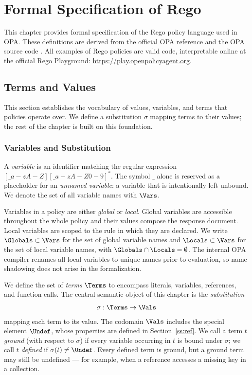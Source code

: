\chapter{Formal Specification of Rego}
\label{ch:form}

This chapter provides formal specification of the Rego policy language used in OPA.
These definitions are derived from the official OPA reference \cite{opa:web} and the OPA source code \cite{opa:git}.
All examples of Rego policies are valid code, interpretable online at the official Rego Playground: \url{https://play.openpolicyagent.org}.

\section{Terms and Values}
\label{s:terms}


This section establishes the vocabulary of values, variables, and terms that \rego policies operate over.
We define a substitution $\sigma$ mapping terms to their values; the rest of the chapter is built on this foundation.


\subsection{Variables and Substitution}
\label{ss:vars}


A \emph{variable} is an identifier matching the regular expression $[\_a-zA-Z][\_a-zA-Z0-9]^*$.
The symbol $\_$ alone is reserved as a placeholder for an \emph{unnamed variable}: a variable that is intentionally left unbound.
We denote the set of all variable names with $\Vars$.

Variables in a \rego policy are either \emph{global} or \emph{local}.
Global variables are accessible throughout the whole policy and their values compose the response document.
Local variables are scoped to the rule in which they are declared.
We write $\Globals \subset \Vars$ for the set of global variable names and $\Locals \subset \Vars$ for the set of local variable names, with $\Globals \cap \Locals = \emptyset$.
The internal OPA compiler renames all local variables to unique names prior to evaluation, so name shadowing does not arise in the formalization.

We define the set of \rego \emph{terms} $\Terms$ to encompass literals, variables, references, and function calls.
The central semantic object of this chapter is the \emph{substitution}
$$\sigma : \Terms \to \Vals$$
mapping each term to its value.
The codomain $\Vals$ includes the special element $\Undef$, whose properties are defined in Section~\ref{ss:ref}.
We call a term $t$ \emph{ground} (with respect to $\sigma$) if every variable occurring in $t$ is bound under $\sigma$; we call $t$ \emph{defined} if $\sigma(t) \neq \Undef$.
Every defined term is ground, but a ground term may still be undefined — for example, when a reference accesses a missing key in a collection.

